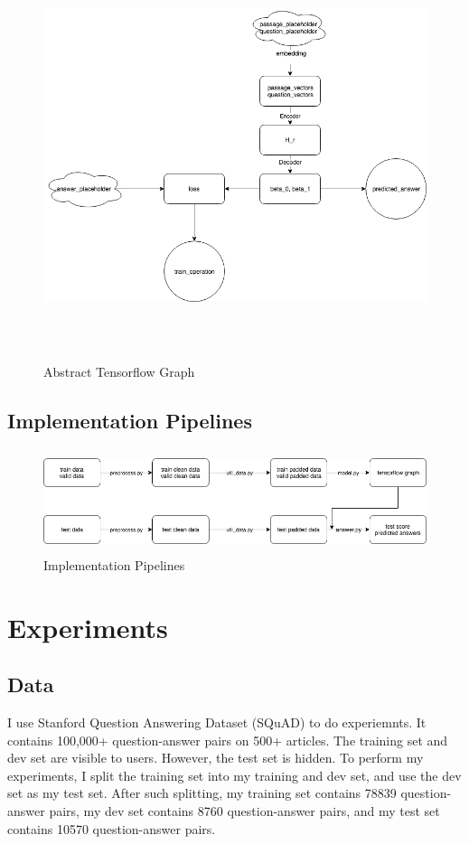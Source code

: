 \documentclass[modernstyle,12pt]{sjsuthesis}
\theoremstyle{definition}
\begin{document}
\begin{figure}[htbp]\centering
  \includegraphics[width=12cm, height=12cm]{figures/tf_graph.png}
  \caption{Abstract Tensorflow Graph}
  \label{f:tf_graph}
\end{figure}




\section{Implementation Pipelines}

\begin{figure}[htbp]\centering
  \includegraphics[width=12cm, height=3cm]{figures/pipeline.png}
  \caption{Implementation Pipelines}
  \label{f:pipeline}
\end{figure}


\chapter{Experiments}
\section{Data}
I use Stanford Question Answering Dataset (SQuAD) to do experiemnts.  It contains 100,000+ question-answer pairs on 500+ articles. The training set and dev set are visible to users. However, the test set is hidden. To perform my experiments, I split the training set into my training and dev set, and use the dev set as my test set. After such splitting, my training set contains 78839 question-answer pairs, my dev set contains 8760 question-answer pairs, and my test set contains 10570 question-answer pairs.
\end{document}
